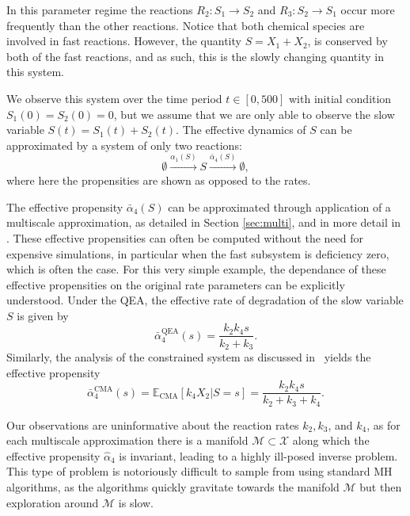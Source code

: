 \documentclass[final]{siamltex}
\begin{document}
 In this 
parameter regime the reactions $R_2\colon S_1\rightarrow S_2$ and $R_3\colon S_2\rightarrow S_1$ occur
more frequently than the other reactions. Notice that both
chemical species are involved in fast reactions. However, the quantity
$S = X_1 + X_2$, is conserved by both of the fast reactions,
and as such, this is the slowly changing quantity in this system.

We observe this system over the time period $t \in [0,500]$ with
initial condition $S_1(0) = S_2(0) = 0$, but we assume that we are only able to observe
the slow variable $S(t) = S_1(t) + S_2(t)$. 
The effective dynamics of $S$ can be approximated by a system of only
two reactions:
\begin{equation}\label{eqn:QSSA_system}
	\emptyset \xrightarrow{\alpha_1(S)} S \xrightarrow{\bar{\alpha}_4(S)} \emptyset,
\end{equation}
where here the propensities are shown as opposed to the rates.

The effective propensity $\bar{\alpha}_4(S)$ can be  approximated through
application of a multiscale approximation, as detailed in Section
\ref{sec:multi}, and in more detail in \cite{cotter2016constrained}. These effective
propensities can often be computed without the need for expensive
simulations, in particular when the fast subsystem is deficiency zero,
which is often the case\cite{anderson2010product,anderson2016product}. For this very
simple example, the dependance of these effective
propensities on the original rate parameters can be explicitly
understood. Under the QEA,
the effective rate of degradation of the slow variable $S$ is given by
\[
	\bar{\alpha}_4^{\text{QEA}}(s) = \frac{k_2k_4s}{k_2+k_3}.
\]
Similarly, the analysis of the constrained system as discussed in~\cite{cotter2016constrained} yields the effective propensity
\begin{equation}\label{eqn:chem_CMA_rate}
	\bar{\alpha}_4^{\text{CMA}}(s) = \mathbb{E}_{\text{CMA}}\left[k_4X_2|S=s\right] = \frac{k_2k_4s}{k_2+k_3+k_4}.
\end{equation}

Our observations are uninformative about the reaction rates $k_2,
k_3$, and $k_4$, as for each multiscale approximation there
is a manifold $\mathcal{M} \subset \mathcal{X}$ along which the effective propensity
$\hat{\alpha}_4$ is invariant, leading to a highly ill-posed inverse
problem. This type of problem is notoriously difficult to
sample from using standard MH algorithms, as the algorithms quickly
gravitate towards the manifold $\mathcal{M}$ but then
exploration around $\mathcal{M}$ is slow.
\end{document}
